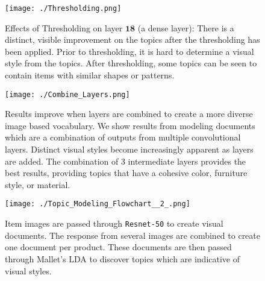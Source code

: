 \documentclass[10pt,twocolumn,letterpaper]{article}
\begin{document}
\begin{figure}[htp]
\centering
        \texttt{[image: ./Thresholding.png]}
\caption{Effects of Thresholding on layer $\mathbf{18}$ (a dense layer): There is a distinct, visible improvement on the topics after the thresholding has been applied. Prior to thresholding, it is hard to determine a visual style from the topics. After thresholding, some topics can be seen to contain items with similar shapes or patterns.}
\label{fig:Thresholding}
\end{figure}

\begin{figure}[htp]
\centering
        \texttt{[image: ./Combine\_Layers.png]}
\caption{Results improve when layers are combined to create a more diverse image based vocabulary. We show results from modeling documents which are a combination of outputs from multiple convolutional layers. Distinct visual styles become increasingly apparent as layers are added. The combination of 3 intermediate layers provides the best results, providing topics that have a cohesive color, furniture style, or material.}
\label{fig:Combining_Layers}
\end{figure}

\begin{figure}[htp]
\centering
        \texttt{[image: ./Topic\_Modeling\_Flowchart\_\_2\_.png]}
\caption{Item images are passed through {\tt Resnet-50} to create visual documents. The response from several images are combined to create one document per product. These documents are then passed through Mallet's LDA to discover topics which are indicative of visual styles.}
\vspace{1mm}
\label{fig:Topic_Modeling_Flowchart}
\end{figure}

{\footnotesize


}
\end{document}

